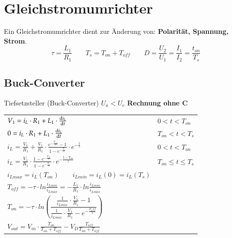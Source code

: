 \section{Gleichstromumrichter}
Ein Gleichstromumrichter dient zur Änderung von: \textbf{Polarität, Spannung, Strom}.\newline
\[ \tau=\frac{L_1}{R_1} \qquad T_s=T_{on} + T_{off} \qquad  D = \frac{U_2}{U_1}=\frac{I_1}{I_2}=\frac{t_{on}}{T_s} \]
\subsection{Buck-Converter}
\begin{minipage}{0.75\linewidth}
    Tiefsetzsteller (Buck-Converter) $U_a < U_e  $\newline
    \textbf{Rechnung ohne C}\newline
    \renewcommand{\arraystretch}{2}
    \begin{tabular}{p{9cm} p{3cm}}
        $ V_1 = i_L\cdot R_1+L_1\cdot\frac{\mathop{}\!\mathrm{d} i_L}{\mathop{}\!\mathrm{d} t} $ &
        $ 0<t<T_{on} $
        \\  
        $ 0 = i_L\cdot R_1+L_1\cdot\frac{\mathop{}\!\mathrm{d} i_L}{\mathop{}\!\mathrm{d} t}$ & $T_{on}<t<T_{s} $
        \\  
        $ i_L=\frac{V_1}{R_1}+ \frac{V_1}{R_1}\cdot \frac{e^{-\frac{T_{off}}{\tau}}-1}{1-e^{-\frac{T_{s}}{\tau}}}\cdot e^{-\frac{t}{\tau}}$ &
        $ 0<t<T_{on}  $
        \\  
        $ i_L=\frac{V_1}{R_1}\cdot \frac{1-e^{-\frac{T_{on}}{\tau}}}{1-e^{-\frac{T_{s}}{\tau}}}\cdot e^{-\frac{t-T_{on}}{\tau}}$ &
        $ T_{on}\leq t \leq T_{s}  $
        \\ 
        $ i_{Lmax} = i_L(T_{on}) \qquad i_{Lmin} = i_L(0) = i_L(T_s) $    
        & \\ 
        $ T_{off}=-\tau \cdot ln\frac{i_{Lmin}}{i_{Lmax}}= -\frac{L_1}{R_1}\cdot ln\frac{i_{Lmin}}{i_{Lmax}} $
        & \\    
        $ T_{on}=-\tau \cdot ln\left(\dfrac{\frac{1}{i_{Lmax}}\cdot\frac{V_1}{R_1}-1}{\frac{1}{i_{Lmax}}\cdot \frac{V_1}{R_1}-e^{-\frac{T_off}{\tau}}}\right) $
        & \\ 
        $ V_{out}=V_{in}\cdot \frac{T_{on}}{T_{on}+T_{off}}-V_D\frac{T_{off}}{T_{on}+T_{off}} $
        & \\ 
    \end{tabular}
\renewcommand{\arraystretch}{1}
\end{minipage}

